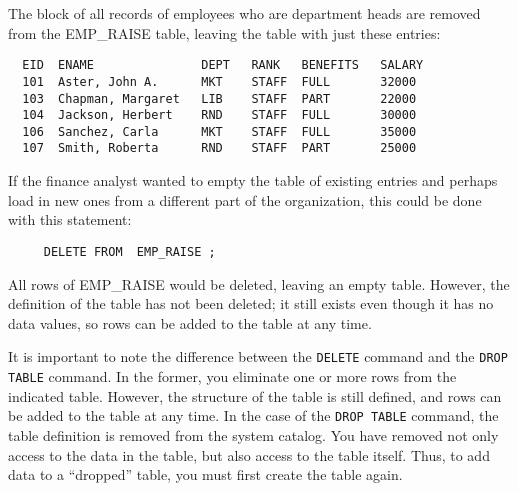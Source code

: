 The block of all records of employees who are department heads are
removed from the EMP\_RAISE table, leaving the table with just these
entries:

\begin{screen}
\begin{verbatim}
  EID  ENAME               DEPT   RANK   BENEFITS   SALARY
  101  Aster, John A.      MKT    STAFF  FULL       32000
  103  Chapman, Margaret   LIB    STAFF  PART       22000
  104  Jackson, Herbert    RND    STAFF  FULL       30000
  106  Sanchez, Carla      MKT    STAFF  FULL       35000
  107  Smith, Roberta      RND    STAFF  PART       25000
\end{verbatim}
\end{screen}

If the finance analyst wanted to empty the table of existing entries
and perhaps load in new ones from a different part of the
organization, this could be done with this statement:
\begin{verbatim}
     DELETE FROM  EMP_RAISE ;
\end{verbatim}

All rows of EMP\_RAISE would be deleted, leaving an empty table.
However, the definition of the table has not been deleted; it still
exists even though it has no data values, so rows can be added to the
table at any time.

It is important to note the difference between the \verb`DELETE` command and
the {\tt DROP TABLE} command.  In the former, you eliminate one or more rows
from the indicated table.  However, the structure of the table is
still defined, and rows can be added to the table at any time.  In the
case of the {\tt DROP TABLE} command, the table definition is removed from
the system catalog.  You have removed not only access to the data in
the table, but also access to the table itself.  Thus, to add data to
a ``dropped'' table, you must first create the table again.


